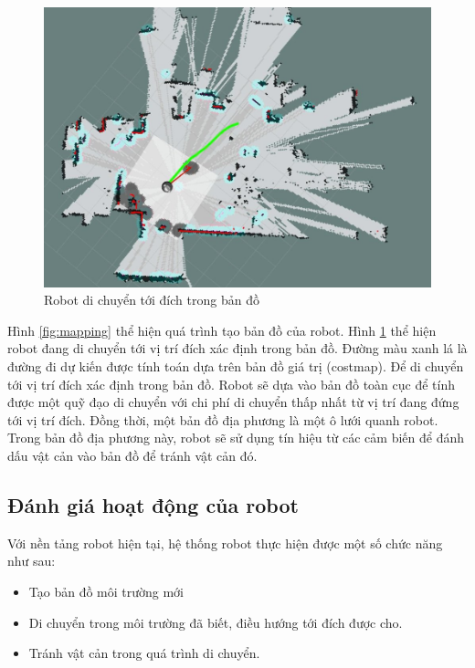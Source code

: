 \begin{figure}[htbp]
    \centering
    \includegraphics[width=0.75\linewidth]{figures/RB_navi_in_map.jpg}
    \caption{Robot di chuyển tới đích trong bản đồ}
    \label{fig:navigation}
\end{figure}

Hình \ref{fig:mapping} thể hiện quá trình tạo bản đồ của robot.
Hình \ref{fig:navigation} thể hiện robot đang di chuyển tới vị trí đích xác định trong bản đồ. Đường màu xanh lá là đường đi dự kiến được tính toán dựa trên bản đồ giá trị (costmap).
Để di chuyển tới vị trí đích xác định trong bản đồ. Robot sẽ dựa vào bản đồ toàn cục để tính được một quỹ đạo di chuyển với chi phí di chuyển thấp nhất từ vị trí đang đứng tới vị trí đích.
Đồng thời, một bản đồ địa phương là một ô lưới quanh robot. Trong bản đồ địa phương này, robot sẽ sử dụng tín hiệu từ các cảm biến để đánh dấu vật cản vào bản đồ để tránh vật cản đó.

\subsection{Đánh giá hoạt động của robot}

Với nền tảng robot hiện tại, hệ thống robot thực hiện được một số chức năng như sau:

\begin{itemize}
    \item Tạo bản đồ môi trường mới
    \item Di chuyển trong môi trường đã biết, điều hướng tới đích được cho.
    \item Tránh vật cản trong quá trình di chuyển.
\end{itemize}

